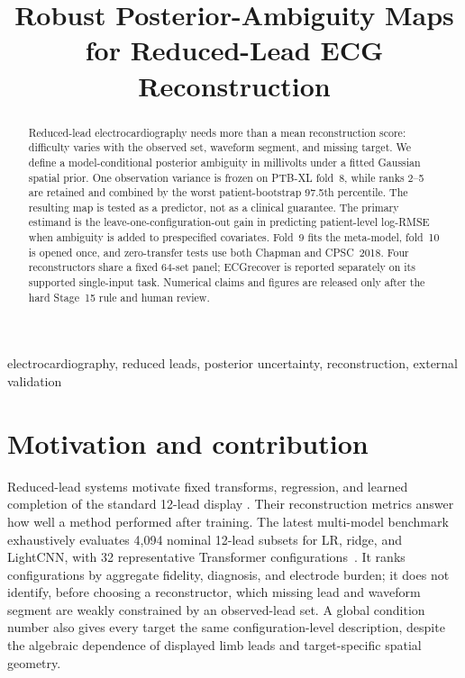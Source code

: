 \documentclass{article}
\title{Robust Posterior-Ambiguity Maps for Reduced-Lead ECG Reconstruction%
\SubmissionBuildTitleSuffix}
\begin{document}
\maketitle

\begin{abstract}
Reduced-lead electrocardiography needs more than a mean reconstruction score: difficulty varies
with the observed set, waveform segment, and missing target.  We define a model-conditional
posterior ambiguity in millivolts under a fitted Gaussian spatial prior.  One observation variance
is frozen on PTB-XL fold~8, while ranks 2--5 are retained and combined by the worst patient-bootstrap
97.5th percentile.  The resulting map is tested as a predictor, not as a clinical guarantee.  The
primary estimand is the leave-one-configuration-out gain in predicting patient-level log-RMSE when
ambiguity is added to prespecified covariates.  Fold~9 fits the meta-model, fold~10 is opened once,
and zero-transfer tests use both Chapman and CPSC~2018.  Four reconstructors share a fixed 64-set
panel; ECGrecover is reported separately on its supported single-input task.  Numerical claims and
figures are released only after the hard Stage~15 rule and human review.  \ResultHeadline
\end{abstract}

\begin{keywords}
electrocardiography, reduced leads, posterior uncertainty, reconstruction, external validation
\end{keywords}

\section{Motivation and contribution}
Reduced-lead systems motivate fixed transforms, regression, and learned completion of the standard
12-lead display
\cite{edenbrandt1988dower,kors1990vcg,nelwan2004reduced,gradowski2025reveals,cardoso2024bayesian,%
lence2025ecgrecover,fang2026imputeecg,pagotto2025minimal}.  Their reconstruction metrics answer how
well a method performed after training.  The latest multi-model benchmark exhaustively evaluates
4,094 nominal 12-lead subsets for LR, ridge, and LightCNN, with 32 representative Transformer
configurations \,\cite{zhang2026systematic}.  It ranks configurations by aggregate fidelity,
diagnosis, and electrode burden; it does not identify, before choosing a reconstructor,
which missing lead and waveform segment are weakly constrained by an observed-lead set.  A global
condition number also gives every target the same configuration-level description, despite the
algebraic dependence of displayed limb leads and target-specific spatial geometry.
\end{document}
